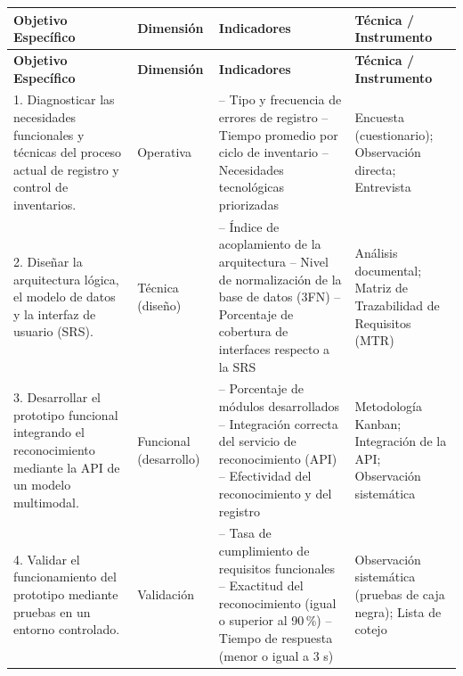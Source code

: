 \documentclass[12pt, letterpaper]{report}
\begin{document}
\scriptsize
{}
\setlength{\LTleft}{0pt}
\setlength{\LTright}{0pt}
\setlength{\tabcolsep}{2pt}
\begin{longtable}{|>{\raggedright\arraybackslash}p{2.5cm}
                  |>{\raggedright\arraybackslash}p{2.1cm}
                  |>{\raggedright\arraybackslash}p{4.0cm}
                  |>{\raggedright\arraybackslash}p{2.9cm}|}
\hline
\textbf{Objetivo Específico} &
\textbf{Dimensión} &
\textbf{Indicadores} &
\textbf{Técnica / Instrumento} \\
\hline
\endfirsthead
\hline
\textbf{Objetivo Específico} &
\textbf{Dimensión} &
\textbf{Indicadores} &
\textbf{Técnica / Instrumento} \\
\hline
\endhead
\hline
\endfoot

1. Diagnosticar las necesidades funcionales y técnicas del proceso
actual de registro y control de inventarios. &
Operativa &
-- Tipo y frecuencia de errores de registro \newline
-- Tiempo promedio por ciclo de inventario \newline
-- Necesidades tecnológicas priorizadas &
Encuesta (cuestionario); Observación directa; Entrevista \\
\hline

2. Diseñar la arquitectura lógica, el modelo de datos y la interfaz de
usuario (SRS). &
Técnica (diseño) &
-- Índice de acoplamiento de la arquitectura \newline
-- Nivel de normalización de la base de datos (3FN) \newline
-- Porcentaje de cobertura de interfaces respecto a la SRS &
Análisis documental; Matriz de Trazabilidad de Requisitos (MTR) \\
\hline

3. Desarrollar el prototipo funcional integrando el reconocimiento
mediante la API de un modelo multimodal. &
Funcional (desarrollo) &
-- Porcentaje de módulos desarrollados \newline
-- Integración correcta del servicio de reconocimiento (API) \newline
-- Efectividad del reconocimiento y del registro &
Metodología Kanban; Integración de la API; Observación
sistemática \\
\hline

4. Validar el funcionamiento del prototipo mediante pruebas en un
entorno controlado. &
Validación &
-- Tasa de cumplimiento de requisitos funcionales \newline
-- Exactitud del reconocimiento (igual o superior al 90\,\%) \newline
-- Tiempo de respuesta (menor o igual a 3 s) &
Observación sistemática (pruebas de caja negra); Lista de cotejo \\
\hline
\end{longtable}
\normalsize
\setlength{\tabcolsep}{6pt}
\end{document}
